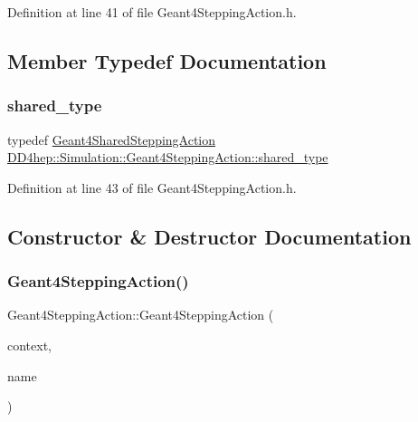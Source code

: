 Definition at line 41 of file Geant4\+Stepping\+Action.\+h.



\subsection{Member Typedef Documentation}
\hypertarget{class_d_d4hep_1_1_simulation_1_1_geant4_stepping_action_aa247da84b511779fc413ecb3fbe57125}{}\label{class_d_d4hep_1_1_simulation_1_1_geant4_stepping_action_aa247da84b511779fc413ecb3fbe57125} 
\subsubsection{\texorpdfstring{shared\+\_\+type}{shared\_type}}
{\footnotesize\ttfamily typedef \hyperlink{class_d_d4hep_1_1_simulation_1_1_geant4_shared_stepping_action}{Geant4\+Shared\+Stepping\+Action} \hyperlink{class_d_d4hep_1_1_simulation_1_1_geant4_stepping_action_aa247da84b511779fc413ecb3fbe57125}{D\+D4hep\+::\+Simulation\+::\+Geant4\+Stepping\+Action\+::shared\+\_\+type}}



Definition at line 43 of file Geant4\+Stepping\+Action.\+h.



\subsection{Constructor \& Destructor Documentation}
\hypertarget{class_d_d4hep_1_1_simulation_1_1_geant4_stepping_action_a0d2be4a83d09e78b27f6f5eb0977260d}{}\label{class_d_d4hep_1_1_simulation_1_1_geant4_stepping_action_a0d2be4a83d09e78b27f6f5eb0977260d} 
\subsubsection{\texorpdfstring{Geant4\+Stepping\+Action()}{Geant4SteppingAction()}}
{\footnotesize\ttfamily Geant4\+Stepping\+Action\+::\+Geant4\+Stepping\+Action (\begin{DoxyParamCaption}\item[{\hyperlink{class_d_d4hep_1_1_simulation_1_1_geant4_context}{Geant4\+Context} $\ast$}]{context,  }\item[{const std\+::string \&}]{name }\end{DoxyParamCaption})}



